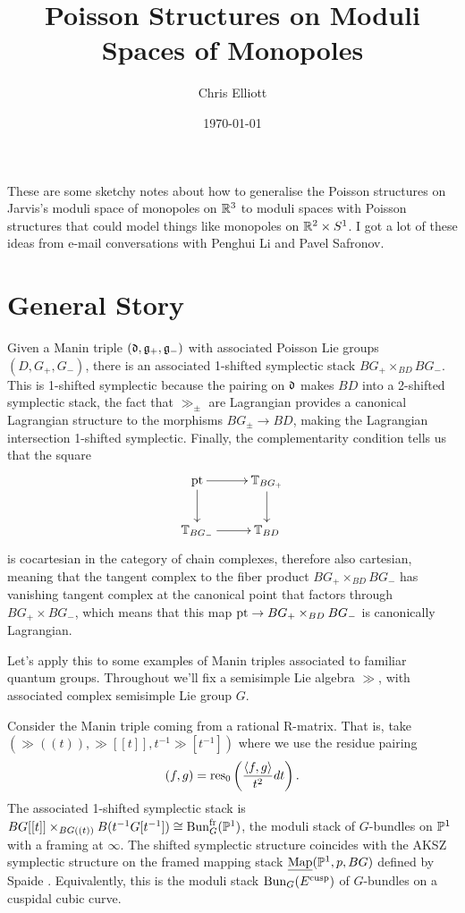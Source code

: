 \documentclass[10pt, oneside, a4paper]{article}
\title{Poisson Structures on Moduli Spaces of Monopoles}
\author{Chris Elliott}
\date{\today}
\newcommand{\map}{\ul{\mr{Map}}}
\begin{document}
\maketitle

These are some sketchy notes about how to generalise the Poisson structures on Jarvis's moduli space of monopoles on $\mathbb{R}^3$ to moduli spaces with Poisson structures that could model things like monopoles on $\mathbb{R}^2 \times S^1$.  I got a lot of these ideas from e-mail conversations with Penghui Li and Pavel Safronov.

\section{General Story}
\begin{definition}
 Given a Manin triple $(\mathfrak{d}, \mathfrak{g}_+, \mathfrak{g}_-)$ with associated Poisson Lie groups $(D, G_+, G_-)$, there is an associated 1-shifted symplectic stack $BG_+ \times_{BD} BG_-$.  This is 1-shifted symplectic because the pairing on $\mathfrak{d}$ makes $BD$ into a 2-shifted symplectic stack, the fact that $\gg_\pm$ are Lagrangian provides a canonical Lagrangian structure to the morphisms $BG_\pm \to BD$, making the Lagrangian intersection 1-shifted symplectic.  Finally, the complementarity condition tells us that the square
 \[\xymatrix{
  \pt \ar[r] \ar[d] &\bb T_{BG_+} \ar[d] \\
  \bb T_{BG_-} \ar[r] &\bb T_{BD}
 }\]
is cocartesian in the category of chain complexes, therefore also cartesian, meaning that the tangent complex to the fiber product $BG_+ \times_{BD} BG_-$ has vanishing tangent complex at the canonical point that factors through $BG_+ \times BG_-$, which means that this map $\operatorname{pt} \to BG_+ \times_{BD} BG_-$ is canonically Lagrangian.
\end{definition}

Let's apply this to some examples of Manin triples associated to familiar quantum groups.  Throughout we'll fix a semisimple Lie algebra $\gg$, with associated complex semisimple Lie group $G$.
\begin{example}
Consider the Manin triple coming from a rational R-matrix.  That is, take $(\gg((t)), \gg[[t]], t^{-1} \gg[t^{-1}])$ where we use the residue pairing
\[( f, g ) = \operatorname{res}_0\left( \frac {\langle f,g \rangle}{t^{2}} dt\right).\]
The associated 1-shifted symplectic stack is $BG[[t]] \times_{BG((t))} B(t^{-1}G[t^{-1}]) \cong \operatorname{Bun}_G^{\mathrm{fr}}(\mathbb{P}^1)$, the moduli stack of $G$-bundles on $\mathbb{P}^1$ with a framing at $\infty$.  The shifted symplectic structure coincides with the AKSZ symplectic structure on the framed mapping stack $\map(\bb P^1, p, BG)$ defined by Spaide \cite{Spaide}.  Equivalently, this is the moduli stack $\operatorname{Bun}_G(E^{\mathrm{cusp}})$ of $G$-bundles on a cuspidal cubic curve.
\end{example}
\end{document}
